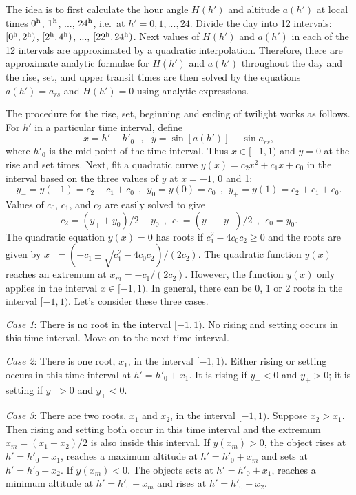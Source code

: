 \documentclass[12pt]{article}
\newcommand \beq {\begin{equation}}
\newcommand \eeq {\end{equation}}
\begin{document}
The idea is to first calculate the hour angle $H(h')$ and altitude $a(h')$ at local times 
$0^{\rm h}$, $1^{\rm h}$, ..., $24^{\rm h}$, i.e.\ at 
$h'=0, 1, ..., 24$. Divide the day into 12 intervals: 
$[0^{\rm h}, 2^{\rm h})$, $[2^{\rm h}, 4^{\rm h})$, ..., $[22^{\rm h}, 24^{\rm h})$. 
Next values of $H(h')$ and $a(h')$ in each of the 12 intervals are approximated by 
a quadratic interpolation. Therefore, there are approximate analytic formulae for $H(h')$ and 
$a(h')$ throughout the day and the rise, set, 
and upper transit times are then solved by the equations $a(h')=a_{rs}$ and $H(h')=0$ 
using analytic expressions. 

The procedure for the rise, set, beginning and ending of twilight works as follows. 
For $h'$ in a particular time interval, define 
\beq
  x = h'-h'_0 \ \ \ , \ \ \ y = \sin [a(h')] - \sin a_{rs} ,
\eeq
where $h'_0$ is the mid-point of the time interval. Thus $x\in [-1,1)$ 
and $y=0$ at the rise and set times. 
Next, fit a quadratic curve $y(x)=c_2 x^2+c_1x+c_0$ in the interval 
based on the three values of $y$ at $x=-1$, 0 and 1: 
\beq
  y_- = y(-1)=c_2-c_1+c_0 \ \ , \ \ y_0=y(0)=c_0 \ \ , \ \ y_+=y(1)=c_2+c_1+c_0 .
\eeq
Values of $c_0$, $c_1$, and $c_2$ are easily solved to give 
\beq
  c_2 = (y_+ + y_0)/2 - y_0 \ \ , \ \ c_1 = (y_+ - y_-)/2  \ \ , \ \  c_0=y_0 .
\eeq
The quadratic equation $y(x)=0$ has roots if $c_1^2-4c_0c_2 \geq 0$ and the 
roots are given by $x_{\pm}=(-c_1\pm \sqrt{c_1^2-4c_0c_2})/(2c_2)$.
The quadratic function $y(x)$ 
reaches an extremum at $x_m=-c_1/(2c_2)$. However, the function $y(x)$ only applies 
in the interval $x\in [-1,1)$. In general, there can be 0, 1 or 2 roots in the interval 
$[-1,1)$. Let's consider these three cases. 

{\em Case 1}: There is no root in the interval $[-1,1)$. No rising and setting 
occurs in this time interval. Move on to the next time interval. 

{\em Case 2}: There is one root, $x_1$, in the interval $[-1,1)$. Either rising or 
setting occurs in this time interval at $h'=h'_0+x_1$. It is rising if $y_-<0$ and 
$y_+>0$; it is setting if $y_->0$ and $y_+<0$. 

{\em Case 3}: There are two roots, $x_1$ and $x_2$, in the interval $[-1,1)$. Suppose 
$x_2>x_1$. Then rising and setting both occur in this time interval and the extremum 
$x_m=(x_1+x_2)/2$ is also inside this interval. If $y(x_m) > 0$, the object rises 
at $h'=h'_0+x_1$, reaches a maximum altitude at $h'=h'_0+x_m$ and sets at 
$h'=h'_0+x_2$. If $y(x_m)<0$. The objects sets at $h'=h'_0+x_1$, reaches 
a minimum altitude at $h'=h'_0+x_m$ and rises at $h'=h'_0+x_2$. 
\end{document}
